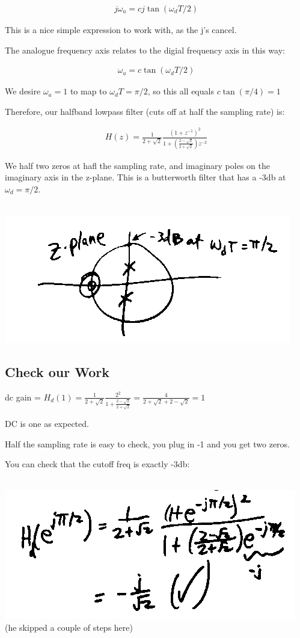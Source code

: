 \begin{align*}
j\omega_a = c j \tan(\omega_d T / 2)
\end{align*}

This is a nice simple expression to work with, as the j's cancel. 

The analogue frequency axis relates to the digial frequency axis in this way:

\begin{align*}
\omega_a = c \tan(\omega_d T / 2)
\end{align*}

We desire $\omega_a = 1$  to map to $\omega_dT = \pi / 2$, so this all equals
$c \tan(\pi/4) = 1$

Therefore, our halfband lowpass filter (cuts off at half the sampling rate) is:

\begin{align*}
H(z) = \frac{1}{2 + \sqrt{2}} \frac{(1+ z^{-1})^2} {1 + 
(\frac{2 - \sqrt{2}}{2 + \sqrt{2}})z^{-2}
}
\end{align*}

We half two zeros at hafl the sampling rate, and imaginary poles on the imaginary
axis in the z-plane. This is a butterworth filter that has a -3db at 
$\omega_d  = \pi/2$. 

\\
\includegraphics[scale=0.5]{frames/17m}\\

\subsection*{Check our Work}

dc gain = $H_d(1) = \frac{1}{2 + \sqrt{2}} 
\frac{2^2}{1 +
\frac{2 - \sqrt{2}}{2 + \sqrt{2}}
} =
\frac{4}{2 +\sqrt{2} + 2 - \sqrt{2} } = 1
$

DC is one as expected.

Half the sampling rate is easy to check, you plug in -1 and you get two zeros.

You can check that the cutoff freq is exactly -3db:

\\
\includegraphics[scale=0.5]{frames/17n}\\

(he skipped a couple of steps here)
